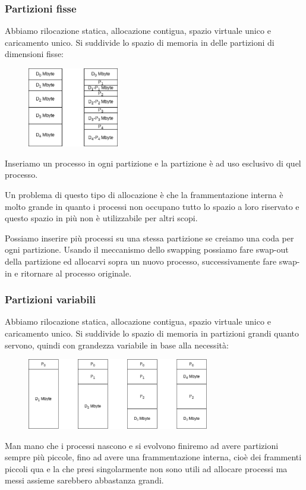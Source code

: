 \subsubsection{Partizioni fisse}
Abbiamo rilocazione statica, allocazione contigua, spazio virtuale unico e caricamento unico.
Si suddivide lo spazio di memoria in delle partizioni di dimensioni fisse:
\begin{figure}[H]
    \centering
    \includegraphics[width=150px]{images/9_Gestione_della_memoria/partizioni_fisse.png}
\end{figure}
Inseriamo un processo in ogni partizione e la partizione è ad uso esclusivo di quel processo.

Un problema di questo tipo di allocazione è che la frammentazione interna è molto grande in quanto i processi non occupano tutto lo spazio a loro riservato e questo spazio in più non è utilizzabile per altri scopi.

Possiamo inserire più processi su una stessa partizione se creiamo una coda per ogni partizione.
Usando il meccanismo dello swapping possiamo fare swap-out della partizione ed allocarvi sopra un nuovo processo, successivamente fare swap-in e ritornare al processo originale.

\subsubsection{Partizioni variabili}
Abbiamo rilocazione statica, allocazione contigua, spazio virtuale unico e caricamento unico.
Si suddivide lo spazio di memoria in partizioni grandi quanto servono, quindi con grandezza variabile in base alla necessità:
\begin{figure}[H]
    \centering
    \includegraphics[width=300px]{images/9_Gestione_della_memoria/partizioni_variabili.png}
\end{figure}
Man mano che i processi nascono e si evolvono finiremo ad avere partizioni sempre più piccole, fino ad avere una frammentazione interna, cioè dei frammenti piccoli qua e la che presi singolarmente non sono utili ad allocare processi ma messi assieme sarebbero abbastanza grandi.

